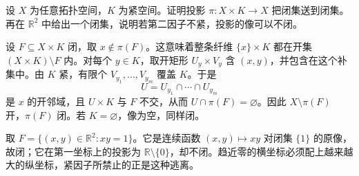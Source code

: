 \begin{exercise}\label{g1:exr:compact-closed-projection}
	设 \(X\) 为任意拓扑空间，\(K\) 为紧空间。证明投影 \(\pi:X\times K\to X\) 把闭集送到闭集。再在 \(\mathbb R^2\) 中给出一个闭集，说明若第二因子不紧，投影的像可以不闭。
\end{exercise}
\begin{solution}
	设 \(F\subseteq X\times K\) 闭，取 \(x\notin\pi(F)\)。这意味着整条纤维 \(\{x\}\times K\) 都在开集 \((X\times K)\setminus F\) 内。对每个 \(y\in K\)，取开矩形 \(U_y\times V_y\) 含 \((x,y)\)，并包含在这个补集中。由 \(K\) 紧，有限个 \(V_{y_1},\ldots,V_{y_m}\) 覆盖 \(K\)。于是
	\[
		U=U_{y_1}\cap\cdots\cap U_{y_m}
	\]
	是 \(x\) 的开邻域，且 \(U\times K\) 与 \(F\) 不交，从而 \(U\cap\pi(F)=\varnothing\)。因此 \(X\setminus\pi(F)\) 开，\(\pi(F)\) 闭。若 \(K=\varnothing\)，像为空，同样闭。

	取 \(F=\{(x,y)\in\mathbb R^2:xy=1\}\)。它是连续函数 \((x,y)\mapsto xy\) 对闭集 \(\{1\}\) 的原像，故闭；它在第一坐标上的投影为 \(\mathbb R\setminus\{0\}\)，却不闭。趋近零的横坐标必须配上越来越大的纵坐标，紧因子所禁止的正是这种逃离。
\end{solution}

